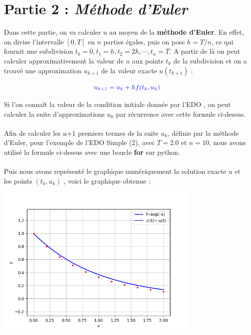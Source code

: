\documentclass{article}
\begin{document}
\section{{\color{red}Partie 2 :} \textit{Méthode d'Euler}}


Dans cette partie, on va calculer u au moyen de la \textbf{méthode d'Euler}. En effet, on divise l'intervalle $[0, T]$ en $n$ parties égales, puis on pose $h=T/n$, ce qui fournit une subdivision $t_0 = 0, t_1 = h, t_2 = 2h, \cdots, t_n = T$. A partir de là on peut calculer approximativement la valeur de $u$ aux points $t_k$ de la subdivision et on a trouvé une approximation $u_{k+1}$ de la valeur exacte $u(t_{k+1})$ :

\begin{equation}
\label{euler}
\color{blue} u_{k+1} = u_k + hf(t_k, u_k)
\end{equation}

Si l'on connaît la valeur de la condition initiale donnée par l'EDO , on peut calculer la suite d'approximations $u_{k}$ par récurrence avec cette formule ci-dessus.
\\ 
\\
Afin de calculer les n+1 premiers termes de la suite $u_{k}$, définie par la méthode d’Euler, pour l’exemple de l'EDO Simple (2), avec $T=2.0$ et $n=10$, nous avons utilisé la formule ci-dessus avec une boucle \textbf{for} sur python.
\\
\\
Puis nous avons représenté le graphique numériquement la solution exacte $u$ et les points $(t_k,u_k)$  , voici le graphique obtenue :

\includegraphics[width=10cm]{2.png}
\end{document}
